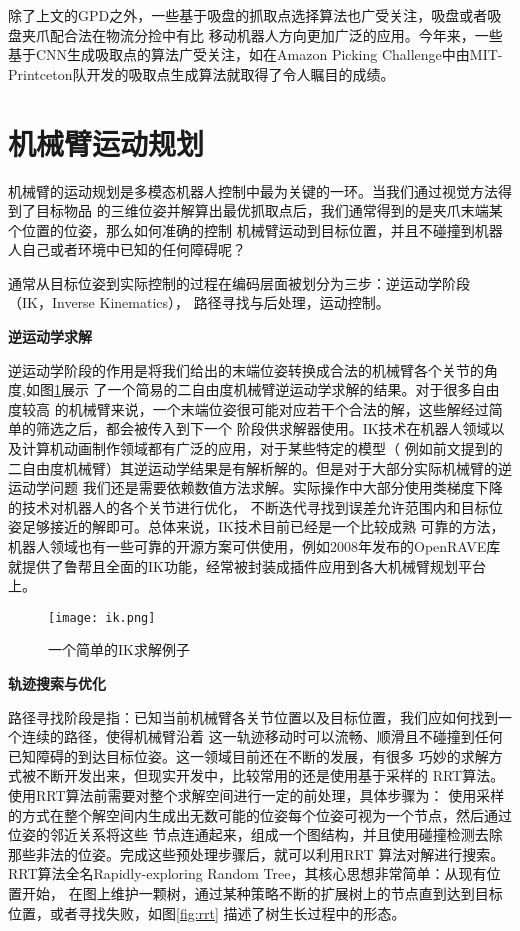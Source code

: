 除了上文的GPD之外，一些基于吸盘的抓取点选择算法也广受关注，吸盘或者吸盘夹爪配合法在物流分捡中有比
移动机器人方向更加广泛的应用。今年来，一些基于CNN生成吸取点的算法广受关注，如在Amazon Picking 
Challenge中由MIT-Printceton队开发的吸取点生成算法\cite{Rodriguez2017Robotic}就取得了令人瞩目的成绩。

\section{机械臂运动规划}

机械臂的运动规划是多模态机器人控制中最为关键的一环。当我们通过视觉方法得到了目标物品
的三维位姿并解算出最优抓取点后，我们通常得到的是夹爪末端某个位置的位姿，那么如何准确的控制
机械臂运动到目标位置，并且不碰撞到机器人自己或者环境中已知的任何障碍呢？

通常从目标位姿到实际控制的过程在编码层面被划分为三步：逆运动学阶段（IK，Inverse Kinematics），
路径寻找与后处理，运动控制。

\noindent \textbf{逆运动学求解}

逆运动学阶段的作用是将我们给出的末端位姿转换成合法的机械臂各个关节的角度,如图\ref{fig:ik}展示
了一个简易的二自由度机械臂逆运动学求解的结果。对于很多自由度较高
的机械臂来说，一个末端位姿很可能对应若干个合法的解，这些解经过简单的筛选之后，都会被传入到下一个
阶段供求解器使用。IK技术在机器人领域以及计算机动画制作领域都有广泛的应用，对于某些特定的模型（
例如前文提到的二自由度机械臂）其逆运动学结果是有解析解的。但是对于大部分实际机械臂的逆运动学问题
我们还是需要依赖数值方法求解。实际操作中大部分使用类梯度下降的技术对机器人的各个关节进行优化，
不断迭代寻找到误差允许范围内和目标位姿足够接近的解即可。总体来说，IK技术目前已经是一个比较成熟
可靠的方法，机器人领域也有一些可靠的开源方案可供使用，例如2008年发布的OpenRAVE库\cite{diankov2008openrave}
就提供了鲁帮且全面的IK功能，经常被封装成插件应用到各大机械臂规划平台上。

\begin{figure}[h] %
  \centering
  \texttt{[image: ik.png]}
  \caption{一个简单的IK求解例子}
  \label{fig:ik}
\end{figure}

\noindent \textbf{轨迹搜索与优化}

路径寻找阶段是指：已知当前机械臂各关节位置以及目标位置，我们应如何找到一个连续的路径，使得机械臂沿着
这一轨迹移动时可以流畅、顺滑且不碰撞到任何已知障碍的到达目标位姿。这一领域目前还在不断的发展，有很多
巧妙的求解方式被不断开发出来\cite{masehian2007classic}，但现实开发中，比较常用的还是使用基于采样的
RRT\cite{lavalle1998rapidly}算法。使用RRT算法前需要对整个求解空间进行一定的前处理，具体步骤为：
使用采样的方式在整个解空间内生成出无数可能的位姿每个位姿可视为一个节点，然后通过位姿的邻近关系将这些
节点连通起来，组成一个图结构，并且使用碰撞检测去除那些非法的位姿。完成这些预处理步骤后，就可以利用RRT
算法对解进行搜索。RRT算法全名Rapidly-exploring Random Tree，其核心思想非常简单：从现有位置开始，
在图上维护一颗树，通过某种策略不断的扩展树上的节点直到达到目标位置，或者寻找失败，如图\ref{fig:rrt}
描述了树生长过程中的形态。

